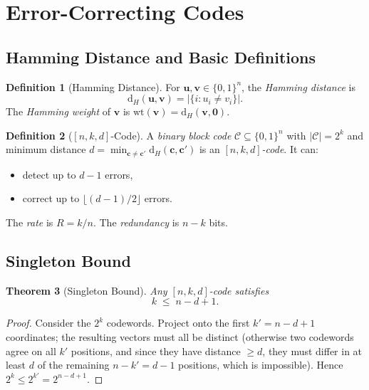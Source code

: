 \documentclass[12pt,a4paper]{amsart}
\newtheorem{theorem}{Theorem}[section]
\theoremstyle{definition}
\newtheorem{definition}[theorem]{Definition}
\theoremstyle{remark}
\newcommand{\wt}{\mathrm{wt}}
\newcommand{\dist}{\mathrm{d}}
\begin{document}
\section{Error-Correcting Codes}

\subsection{Hamming Distance and Basic Definitions}

\begin{definition}[Hamming Distance]
For $\mathbf{u}, \mathbf{v} \in \{0,1\}^n$, the \emph{Hamming distance} is
\[
  \dist_H(\mathbf{u}, \mathbf{v}) = |\{i : u_i \neq v_i\}|.
\]
The \emph{Hamming weight} of $\mathbf{v}$ is $\wt(\mathbf{v}) = \dist_H(\mathbf{v},
\mathbf{0})$.
\end{definition}

\begin{definition}[{$[n,k,d]$}-Code]
A \emph{binary block code} $\mathcal{C} \subseteq \{0,1\}^n$ with $|\mathcal{C}| =
2^k$ and minimum distance $d = \min_{\mathbf{c} \neq \mathbf{c}'} \dist_H(\mathbf{c},
\mathbf{c}')$ is an \emph{$[n,k,d]$-code}. It can:
\begin{itemize}
  \item detect up to $d-1$ errors,
  \item correct up to $\lfloor (d-1)/2 \rfloor$ errors.
\end{itemize}
The \emph{rate} is $R = k/n$. The \emph{redundancy} is $n - k$ bits.
\end{definition}

\subsection{Singleton Bound}

\begin{theorem}[Singleton Bound]\label{thm:singleton}
Any $[n,k,d]$-code satisfies
\[
  k \;\leq\; n - d + 1.
\]
\end{theorem}
\begin{proof}
Consider the $2^k$ codewords. Project onto the first $k' = n-d+1$ coordinates;
the resulting vectors must all be distinct (otherwise two codewords agree on all
$k'$ positions, and since they have distance $\geq d$, they must differ in at
least $d$ of the remaining $n-k'=d-1$ positions, which is impossible). Hence
$2^k \leq 2^{k'} = 2^{n-d+1}$.
\end{proof}
\end{document}
